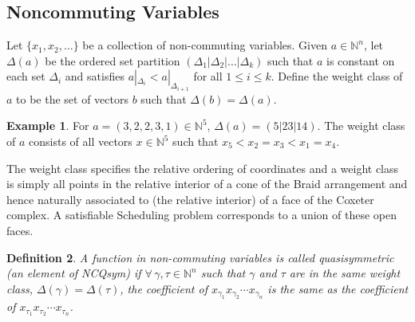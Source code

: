 \documentclass[12pt,reqno]{amsart}
\newtheorem{definition}{Definition}
\numberwithin{definition}{section}
\theoremstyle{definition}
\newtheorem{example}[definition]{Example}
\begin{document}
\subsection{Noncommuting Variables}




Let $\{x_1, x_2, \ldots \}$ be a collection of non-commuting
variables.  Given $a \in \mathbb{N}^n$, let $\Delta(a)$
be the ordered set partition $(\Delta_1 | \Delta_2 | \ldots | \Delta_k)$ such that 
$a$ is constant on each set $\Delta_i$
and satisfies $a|_{\Delta_i} < a|_{\Delta_{i+1}}$ for all $1 \leq i \leq k$. 
Define the weight class of $a$ to be the set of vectors $b$
such that $\Delta(b) = \Delta(a)$.  

\begin{example}
For $a = (3,2,2,3,1) \in \mathbb{N}^5$, $\Delta(a) =
(5|23|14)$.  The weight class of $a$ consists of all vectors $x
\in \mathbb{N}^5$ such that $x_5 < x_2 = x_3 < x_1 = x_4$. 
\end{example}


The weight class specifies the relative ordering of coordinates and a
weight class is simply all points in the relative interior of a cone
of the Braid arrangement and hence naturally associated to (the relative interior) of a face of
the Coxeter complex.  A satisfiable Scheduling problem corresponds to a union of these open faces.   


\begin{definition}
A function in non-commuting variables is called quasisymmetric (an element of NCQsym) if
$\forall \, \gamma, \tau \in \mathbb{N}^n$ such that $\gamma$ and $\tau$
are in the same weight class, $\Delta(\gamma) =
\Delta(\tau)$, the coefficient of $x_{\gamma_1}x_{\gamma_2} \cdots
x_{\gamma_n}$ is the same as the coefficient of $x_{\tau_1}x_{\tau_2} \cdots x_{\tau_n}$.
\end{definition}
\end{document}
